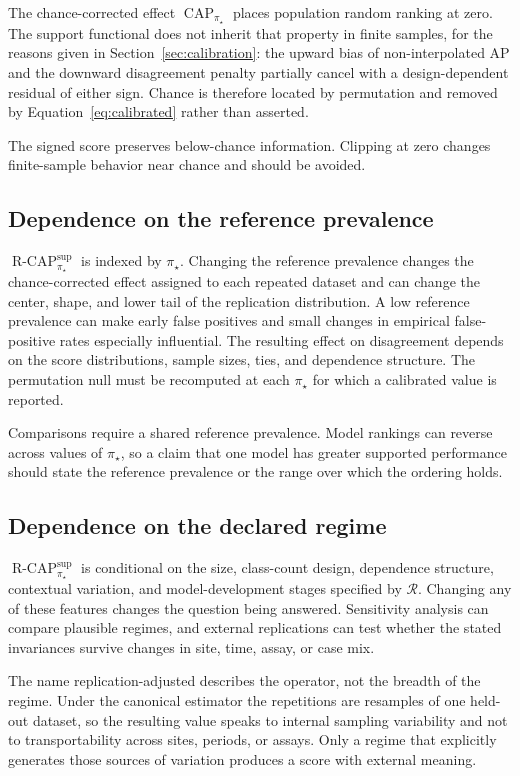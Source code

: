 \documentclass[11pt]{article}
\newcommand{\CAP}{\operatorname{CAP}}
\newcommand{\Regime}{\mathcal{R}}
\newcommand{\Tpi}{\CAP_{\pi_\star}}
\newcommand{\RCAP}{\operatorname{R\text{-}CAP}^{\mathrm{sup}}_{\pi_\star}}
\theoremstyle{remark}
\begin{document}
The chance-corrected effect $\Tpi$ places population random ranking at zero. The support functional does not inherit that property in finite samples, for the reasons given in Section~\ref{sec:calibration}: the upward bias of non-interpolated AP and the downward disagreement penalty partially cancel with a design-dependent residual of either sign. Chance is therefore located by permutation and removed by Equation~\eqref{eq:calibrated} rather than asserted.

The signed score preserves below-chance information. Clipping at zero changes finite-sample behavior near chance and should be avoided.

\subsection{Dependence on the reference prevalence}

$\RCAP$ is indexed by $\pi_\star$. Changing the reference prevalence changes the chance-corrected effect assigned to each repeated dataset and can change the center, shape, and lower tail of the replication distribution. A low reference prevalence can make early false positives and small changes in empirical false-positive rates especially influential. The resulting effect on disagreement depends on the score distributions, sample sizes, ties, and dependence structure. The permutation null must be recomputed at each $\pi_\star$ for which a calibrated value is reported.

Comparisons require a shared reference prevalence. Model rankings can reverse across values of $\pi_\star$, so a claim that one model has greater supported performance should state the reference prevalence or the range over which the ordering holds.

\subsection{Dependence on the declared regime}

$\RCAP$ is conditional on the size, class-count design, dependence structure, contextual variation, and model-development stages specified by $\Regime$. Changing any of these features changes the question being answered. Sensitivity analysis can compare plausible regimes, and external replications can test whether the stated invariances survive changes in site, time, assay, or case mix.

The name replication-adjusted describes the operator, not the breadth of the regime. Under the canonical estimator the repetitions are resamples of one held-out dataset, so the resulting value speaks to internal sampling variability and not to transportability across sites, periods, or assays. Only a regime that explicitly generates those sources of variation produces a score with external meaning.
\end{document}
